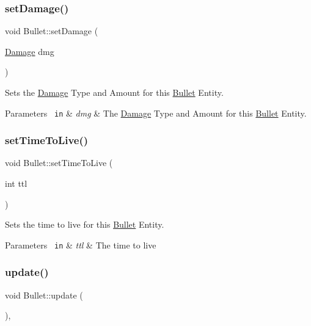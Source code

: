 \subsubsection{\texorpdfstring{setDamage()}{setDamage()}}
{\footnotesize\ttfamily void Bullet\+::set\+Damage (\begin{DoxyParamCaption}\item[{\mbox{\hyperlink{struct_damage}{Damage}}}]{dmg }\end{DoxyParamCaption})}



Sets the \mbox{\hyperlink{struct_damage}{Damage}} Type and Amount for this \mbox{\hyperlink{class_bullet}{Bullet}} Entity. 


\begin{DoxyParams}[1]{Parameters}
\mbox{\texttt{ in}}  & {\em dmg} & The \mbox{\hyperlink{struct_damage}{Damage}} Type and Amount for this \mbox{\hyperlink{class_bullet}{Bullet}} Entity. \\
\hline
\end{DoxyParams}
\mbox{\label{class_bullet_a1f439ddfbd1197e9f9f2e702467853a9}} 
\subsubsection{\texorpdfstring{setTimeToLive()}{setTimeToLive()}}
{\footnotesize\ttfamily void Bullet\+::set\+Time\+To\+Live (\begin{DoxyParamCaption}\item[{int}]{ttl }\end{DoxyParamCaption})}



Sets the time to live for this \mbox{\hyperlink{class_bullet}{Bullet}} Entity. 


\begin{DoxyParams}[1]{Parameters}
\mbox{\texttt{ in}}  & {\em ttl} & The time to live \\
\hline
\end{DoxyParams}
\mbox{\label{class_bullet_a738b3fde0d24a67ea0a922cbf9693803}} 
\subsubsection{\texorpdfstring{update()}{update()}}
{\footnotesize\ttfamily void Bullet\+::update (\begin{DoxyParamCaption}{ }\end{DoxyParamCaption})\hspace{0.3cm}{\ttfamily [override]}, {\ttfamily [virtual]}}



